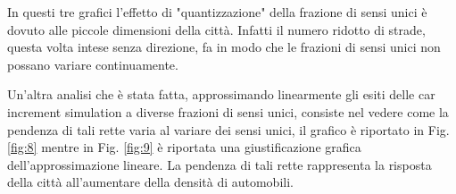 \documentclass[main.tex]{subfiles}
\begin{document}
        In questi tre grafici l'effetto di "quantizzazione" della frazione di sensi unici è dovuto alle piccole dimensioni della città.
        Infatti il numero ridotto di strade, questa volta intese senza direzione, fa in modo che le frazioni di sensi unici non possano variare
        continuamente.

        \newpage

        Un'altra analisi che è stata fatta, approssimando linearmente gli esiti delle car increment simulation a diverse frazioni di sensi unici, consiste nel vedere
        come la pendenza di tali rette varia al variare dei sensi unici, il grafico è riportato in Fig. \ref{fig:8} mentre in Fig. \ref{fig:9} è riportata 
        una giustificazione grafica dell'approssimazione lineare. La pendenza di tali rette rappresenta la risposta della città all'aumentare della densità di 
        automobili.
\end{document}
